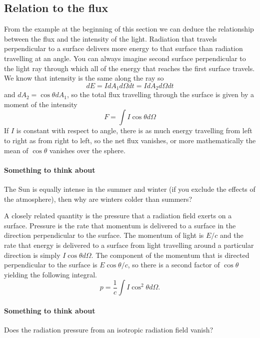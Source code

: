 \subsection{Relation to the flux}
\label{sec:relation-flux}

From the example at the beginning of this section we can deduce the 
relationship between the flux and the intensity of the light.
Radiation that travels perpendicular to a surface delivers more energy to 
that surface than radiation travelling at an angle.   You can always
imagine second surface perpendicular to the light ray through which all of
the energy that reaches the first surface travels.  We know that
intensity is the same along the ray so
\begin{equation}
d E = I d\!A_1 d \Omega d t= I d\!A_2 d \Omega d t
\label{eq:5}
\end{equation}
and $d\!A_2 = \cos \theta d\!A_1$, so the total flux travelling through
the surface is given by a moment of the intensity
\begin{equation}
F = \int I \cos \theta d \Omega
\label{eq:6}
\end{equation}
If $I$ is constant with respect to angle, there is as much energy
travelling from left to right as from right to left, so the net flux
vanishes, or more mathematically the mean of $\cos \theta$ vanishes 
over the sphere.

\paragraph{Something to think about}   The Sun is equally intense in
the summer and winter (if you exclude the effects of the
atmosphere), then why are winters colder than summers?   

A closely related quantity is the pressure that a radiation field
exerts on a surface.  Pressure is the rate that momentum is delivered 
to a surface in the direction perpendicular to the surface.  The
momentum of light is $E/c$ and the rate that energy is 
delivered to a surface from light travelling around a particular
direction is simply $I \cos \theta d\Omega$.  The component 
of the momentum that is directed perpendicular to the surface 
is $E \cos\theta/c$, so there is a second factor of $\cos \theta$ 
yielding the following integral.
\begin{equation}
p = \frac{1}{c} \int I \cos^2 \theta d \Omega.
\label{eq:7}
\end{equation}

\paragraph{Something to think about}  Does the radiation pressure 
from an isotropic radiation field vanish?

